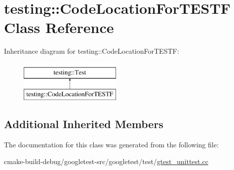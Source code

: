 \hypertarget{classtesting_1_1CodeLocationForTESTF}{}\section{testing\+::Code\+Location\+For\+T\+E\+S\+TF Class Reference}
\label{classtesting_1_1CodeLocationForTESTF}
Inheritance diagram for testing\+::Code\+Location\+For\+T\+E\+S\+TF\+:\begin{figure}[H]
\begin{center}
\leavevmode
\includegraphics[height=2.000000cm]{classtesting_1_1CodeLocationForTESTF}
\end{center}
\end{figure}
\subsection*{Additional Inherited Members}


The documentation for this class was generated from the following file\+:\begin{DoxyCompactItemize}
\item 
cmake-\/build-\/debug/googletest-\/src/googletest/test/\mbox{\hyperlink{gtest__unittest_8cc}{gtest\+\_\+unittest.\+cc}}\end{DoxyCompactItemize}

